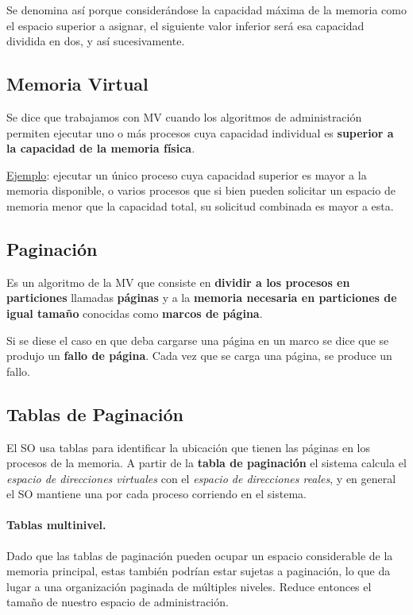 \documentclass[10pt,a4paper]{article}
\begin{document}
Se denomina así porque considerándose la capacidad máxima de la memoria como el espacio superior a asignar, el siguiente valor inferior será esa capacidad dividida en dos, y así sucesivamente. 

\subsection{Memoria Virtual}
Se dice que trabajamos con MV cuando los algoritmos de administración permiten ejecutar uno o más procesos cuya capacidad individual es \textbf{superior a la capacidad de la memoria física}.

\underline{Ejemplo}: ejecutar un único proceso cuya capacidad superior es mayor a la memoria disponible, o varios procesos que si bien pueden solicitar un espacio de memoria menor que la capacidad total, su solicitud combinada es mayor a esta.

\subsection{Paginación}
Es un algoritmo de la MV que consiste en \textbf{dividir a los procesos en particiones} llamadas \textbf{páginas} y a la \textbf{memoria necesaria en particiones de igual tamaño} conocidas como \textbf{marcos de página}.

Si se diese el caso en que deba cargarse una página en un marco se dice que se produjo un \textbf{fallo de página}. Cada vez que se carga una página, se produce un fallo.

\subsection{Tablas de Paginación}

El SO usa tablas para identificar la ubicación que tienen las páginas en los procesos de la memoria. A partir de la \textbf{tabla de paginación} el sistema calcula el \textit{espacio de direcciones virtuales} con el \textit{espacio de direcciones reales}, y en general el SO mantiene una por cada proceso corriendo en el sistema.

\paragraph{Tablas multinivel.} Dado que las tablas de paginación pueden ocupar un espacio considerable de la memoria principal, estas también podrían estar sujetas a paginación, lo que da lugar a una organización paginada de múltiples niveles. Reduce entonces el tamaño de nuestro espacio de administración.
\end{document}
